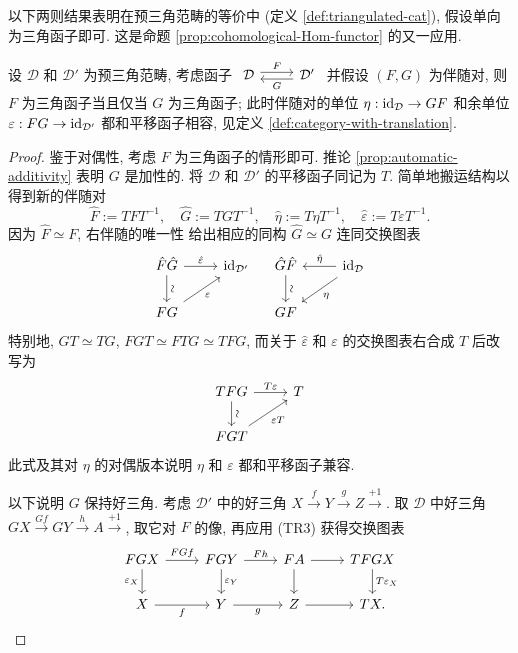 以下两则结果表明在预三角范畴的等价中 (定义 \ref{def:triangulated-cat}), 假设单向为三角函子即可. 这是命题 \ref{prop:cohomological-Hom-functor} 的又一应用.

\begin{proposition}\label{prop:adjoint-triangulated}
	设 $\mathcal{D}$ 和 $\mathcal{D}'$ 为预三角范畴, 考虑函子
	$\begin{tikzcd}
		\mathcal{D} \arrow[shift left, r, "F"] & \mathcal{D}' \arrow[shift left, l, "G"]
	\end{tikzcd}$
	并假设 $(F, G)$ 为伴随对, 则 $F$ 为三角函子当且仅当 $G$ 为三角函子; 此时伴随对的单位 $\eta: \mathrm{id}_{\mathcal{D}} \to GF$ 和余单位 $\varepsilon: FG \to \mathrm{id}_{\mathcal{D}'}$ 都和平移函子相容, 见定义 \ref{def:category-with-translation}.
\end{proposition}
\begin{proof}
	鉴于对偶性, 考虑 $F$ 为三角函子的情形即可. 推论 \ref{prop:automatic-additivity} 表明 $G$ 是加性的. 将 $\mathcal{D}$ 和 $\mathcal{D}'$ 的平移函子同记为 $T$. 简单地搬运结构以得到新的伴随对
	\[ \hat{F} := T F T^{-1}, \quad \hat{G} := T G T^{-1}, \quad \hat{\eta} := T\eta T^{-1}, \quad \hat{\varepsilon} := T \varepsilon T^{-1}. \]
	因为 $\hat{F} \simeq F$, 右伴随的唯一性 \cite[命题 2.6.10]{Li1} 给出相应的同构 $\hat{G} \simeq G$ 连同交换图表
	\[\begin{tikzcd}
		\hat{F} \hat{G} \arrow[r, "\hat{\varepsilon}"] \arrow[d, "\sim" sloped] & \identity_{\mathcal{D}'} \\
		FG \arrow[ru, "{\varepsilon}"'] &
	\end{tikzcd} \quad \begin{tikzcd}
		\hat{G} \hat{F} \arrow[d, "\sim" sloped] & \identity_{\mathcal{D}} \arrow[l, "\hat{\eta}"'] \arrow[ld, "\eta"] \\
		GF &
	\end{tikzcd}\]
	特别地, $GT \simeq TG$, $FGT \simeq FTG \simeq TFG$, 而关于 $\hat{\varepsilon}$ 和 $\varepsilon$ 的交换图表右合成 $T$ 后改写为
	\begin{equation}\label{eqn:adjoint-triangulated-aux0}\begin{tikzcd}
		TFG \arrow[r, "{T\varepsilon}"] \arrow[d, "\sim" sloped] & T \\
		FGT \arrow[ru, "\varepsilon T"'] &
	\end{tikzcd}\end{equation}
	此式及其对 $\eta$ 的对偶版本说明 $\eta$ 和 $\varepsilon$ 都和平移函子兼容.
	
	以下说明 $G$ 保持好三角. 考虑 $\mathcal{D}'$ 中的好三角 $X \xrightarrow{f} Y \xrightarrow{g} Z \xrightarrow{+1}$. 取 $\mathcal{D}$ 中好三角 $GX \xrightarrow{Gf} GY \xrightarrow{h} A \xrightarrow{+1}$, 取它对 $F$ 的像, 再应用 (TR3) 获得交换图表
	\begin{equation*}\begin{tikzcd}
		FG X \arrow[r, "FGf"] \arrow[d, "\varepsilon_X"'] & FG Y \arrow[d, "\varepsilon_Y"] \arrow[r, "Fh"] & FA \arrow[r] \arrow[d] & TFGX \arrow[d, "T\varepsilon_X"] \\
		X \arrow[r, "f"'] & Y \arrow[r, "g"'] & Z \arrow[r] & TX .
	\end{tikzcd}\end{equation*}


\end{proof}
